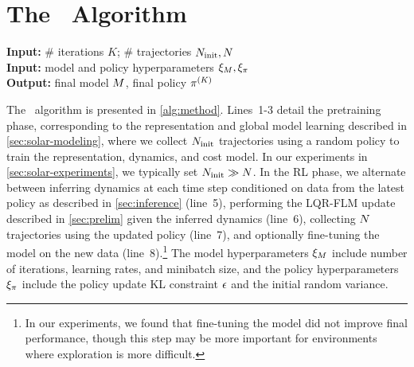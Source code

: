 \section{The \metabbr\ Algorithm}
\label{sec:method}

\begin{algorithm}[t]
\hspace*{\algorithmicindent}\textbf{Input:} \# iterations $K$; \# trajectories $N_{\text{init}},N$\\
\hspace*{\algorithmicindent}\textbf{Input:} model and policy hyperparameters $\xi_M, \xi_\pi$\\
\hspace*{\algorithmicindent}\textbf{Output:} final model $M$, final policy $\pi^{(K)}$\\
\vspace{-.5em}
\begin{algorithmic}[1]
    \vspace{-1em}
\ENDFOR
\end{algorithmic}
\caption{\metabbr}
\label{alg:method}
\end{algorithm}

The \metabbr\ algorithm is presented in \autoref{alg:method}. Lines~\mbox{1-3} detail the pretraining phase, corresponding to the representation and global model learning described in \autoref{sec:solar-modeling}, where we collect $N_{\text{init}}$ trajectories using a random policy to train the representation, dynamics, and cost model. In our experiments in \autoref{sec:solar-experiments}, we typically set $N_{\text{init}}\gg N$. In the RL phase, we alternate between inferring dynamics at each time step conditioned on data from the latest policy as described in \autoref{sec:inference} (line~5), performing the LQR-FLM update described in \autoref{sec:prelim} given the inferred dynamics (line~6), collecting $N$ trajectories using the updated policy (line~7), and optionally fine-tuning the model on the new data (line~8).\footnote{In our experiments, we found that fine-tuning the model did not improve final performance, though this step may be more important for environments where exploration is more difficult.} The model hyperparameters $\xi_M$ include number of iterations, learning rates, and minibatch size, and the policy hyperparameters $\xi_\pi$ include the policy update KL constraint $\epsilon$ and the initial random variance.

